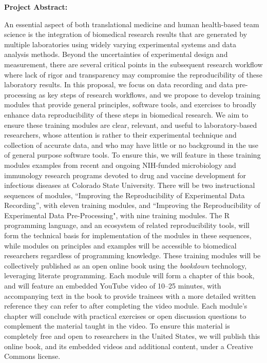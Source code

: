 \documentclass[pdftex,english,11.5pt,parskip=half]{scrartcl}
\begin{document}
\def\bf{\normalfont\bfseries}
\pagestyle{empty}

{\large \textbf{Project Abstract:}}


An essential aspect of both translational medicine and human 
health-based team science is the integration of biomedical research 
results that are generated by multiple laboratories using widely varying 
experimental systems and data analysis methods. Beyond the uncertainties of 
experimental design and measurement, there are several critical points in 
the subsequent research workflow where lack of rigor and transparency 
may compromise the reproducibility of these laboratory results.  In this proposal, 
we focus on data recording and data pre-processing as key steps 
of research workflows, and we propose to develop training modules that 
provide general principles, software tools, and exercises to broadly 
enhance data reproducibility of these steps in biomedical research. We aim to
ensure these training modules are clear, relevant, and useful to laboratory-based 
researchers, whose attention is rather to their experimental technique and collection 
of accurate data, and who may have little or no background in the use of general 
purpose software tools.  To ensure this, we will feature in these training modules 
examples from recent and ongoing NIH-funded microbiology and immunology research 
programs devoted to drug and vaccine development for infectious diseases at 
Colorado State University. 
There will be two instructional sequences of modules, ``Improving the Reproducibility of Experimental Data Recording'', with eleven training modules, 
and ``Improving the Reproducibility of Experimental Data Pre-Processing", with nine training modules.
The R programming language, and an ecosystem of
related reproducibility tools, will form the technical basis for implementation
of the modules in these sequences, while modules on principles and examples will be accessible to biomedical researchers regardless of programming knowledge.  
These training modules will be collectively
published as an open online book using the \textit{bookdown} technology, leveraging literate 
programming. Each
module will form a chapter of this book, and will feature an embedded YouTube
video of 10--25 minutes, with accompanying text in the book to provide trainees
with a more detailed written reference they can refer to after completing the
video module.  Each module's chapter will conclude with practical exercises or
open discussion questions to complement the material taught in the video. 
To
ensure this material is completely free and open to researchers in the United
States, we will publish this online book, and its embedded videos and additional content, under a Creative Commons
license.
\end{document}
